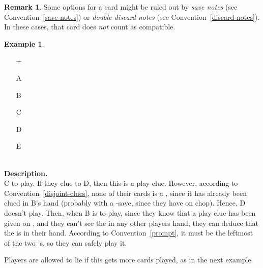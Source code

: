 \documentclass[a4paper]{article}
\theoremstyle{plain}
\theoremstyle{definition}
\newtheorem{remark}[theorem]{Remark}
\newtheorem{example}[theorem]{Example}
\begin{document}
\begin{remark}
	Some options for a card might be ruled out by \emph{save notes} (see Convention~\ref{save-notes}) or \emph{double discard notes} (see Convention~\ref{discard-notes}). In these cases, that card does \emph{not} count as compatible.
\end{remark}

\begin{example} \hfill \\
	\begin{minipage}{0.45\textwidth}
		\begin{itemize}
			\item[\Large +]      
			\item[\Large A]    
			\item[\Large B]    
			\item[\Large C]    
			\item[\Large D]    
			\item[\Large E]    
		\end{itemize}
	\end{minipage}%
	\begin{minipage}{0.55\textwidth}
		\hfill \\
		
		\textbf{Description.} \\
		
		C to play. If they clue  to D, then this is a play clue. However, according to Convention~\ref{disjoint-clues}, none of their cards is a , since it has already been clued in B's hand (probably with a -save, since they have  on chop). Hence, D doesn't play. Then, when B is to play, since they know that a play clue has been given on , and they can't see the  in any other players hand, they can deduce that the  is in their hand. According to Convention~\ref{prompt}, it must be the leftmost of the two 's, so they can safely play it.
	\end{minipage}
\end{example} \vspace{0.15 cm}

Players are allowed to lie if this gets more cards played, as in the next example.
\end{document}
